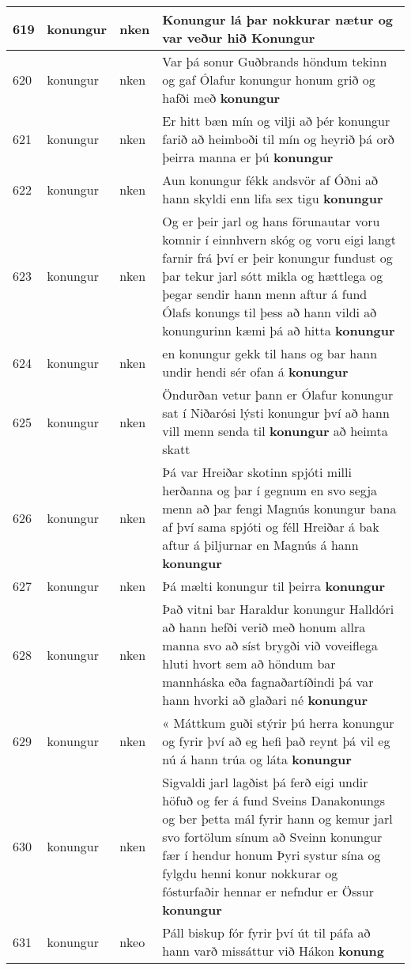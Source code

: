 \documentclass{article}
\begin{document}
\begin{longtable}{p{1cm}|p{1cm}|p{1cm}|p{13cm}}
\hline
619&konungur&nken&Konungur lá þar nokkurar nætur og var veður hið \textbf{Konungur} \\
\hline
620&konungur&nken&Var þá sonur Guðbrands höndum tekinn og gaf Ólafur konungur honum grið og hafði með \textbf{konungur} \\
\hline
621&konungur&nken&Er hitt bæn mín og vilji að þér konungur farið að heimboði til mín og heyrið þá orð þeirra manna er þú \textbf{konungur} \\
\hline
622&konungur&nken&Aun konungur fékk andsvör af Óðni að hann skyldi enn lifa sex tigu \textbf{konungur} \\
\hline
623&konungur&nken&Og er þeir jarl og hans förunautar voru komnir í einnhvern skóg og voru eigi langt farnir frá því er þeir konungur fundust og þar tekur jarl sótt mikla og hættlega og þegar sendir hann menn aftur á fund Ólafs konungs til þess að hann vildi að konungurinn kæmi þá að hitta \textbf{konungur} \\
\hline
624&konungur&nken&en konungur gekk til hans og bar hann undir hendi sér ofan á \textbf{konungur} \\
\hline
625&konungur&nken&Öndurðan vetur þann er Ólafur konungur sat í Niðarósi lýsti konungur því að hann vill menn senda til \textbf{konungur} að heimta skatt\\
\hline
626&konungur&nken&Þá var Hreiðar skotinn spjóti milli herðanna og þar í gegnum en svo segja menn að þar fengi Magnús konungur bana af því sama spjóti og féll Hreiðar á bak aftur á þiljurnar en Magnús á hann \textbf{konungur} \\
\hline
627&konungur&nken&Þá mælti konungur til þeirra \textbf{konungur} \\
\hline
628&konungur&nken&Það vitni bar Haraldur konungur Halldóri að hann hefði verið með honum allra manna svo að síst brygði við voveiflega hluti hvort sem að höndum bar mannháska eða fagnaðartíðindi þá var hann hvorki að glaðari né \textbf{konungur} \\
\hline
629&konungur&nken&« Máttkum guði stýrir þú herra konungur og fyrir því að eg hefi það reynt þá vil eg nú á hann trúa og láta \textbf{konungur} \\
\hline
630&konungur&nken&Sigvaldi jarl lagðist þá ferð eigi undir höfuð og fer á fund Sveins Danakonungs og ber þetta mál fyrir hann og kemur jarl svo fortölum sínum að Sveinn konungur fær í hendur honum Þyri systur sína og fylgdu henni konur nokkurar og fósturfaðir hennar er nefndur er Össur \textbf{konungur} \\
\hline
631&konungur&nkeo&Páll biskup fór fyrir því út til páfa að hann varð missáttur við Hákon \textbf{konung} \\

\end{longtable}
\end{document}
